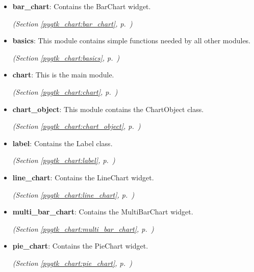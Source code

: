 \begin{itemize}
\setlength{\parskip}{0ex}
\item \textbf{bar\_chart}: Contains the BarChart widget.



  \textit{(Section \ref{pygtk_chart:bar_chart}, p.~\pageref{pygtk_chart:bar_chart})}

\item \textbf{basics}: This module contains simple functions needed by all other modules.



  \textit{(Section \ref{pygtk_chart:basics}, p.~\pageref{pygtk_chart:basics})}

\item \textbf{chart}: This is the main module.



  \textit{(Section \ref{pygtk_chart:chart}, p.~\pageref{pygtk_chart:chart})}

\item \textbf{chart\_object}: This module contains the ChartObject class.



  \textit{(Section \ref{pygtk_chart:chart_object}, p.~\pageref{pygtk_chart:chart_object})}

\item \textbf{label}: Contains the Label class.



  \textit{(Section \ref{pygtk_chart:label}, p.~\pageref{pygtk_chart:label})}

\item \textbf{line\_chart}: Contains the LineChart widget.



  \textit{(Section \ref{pygtk_chart:line_chart}, p.~\pageref{pygtk_chart:line_chart})}

\item \textbf{multi\_bar\_chart}: Contains the MultiBarChart widget.



  \textit{(Section \ref{pygtk_chart:multi_bar_chart}, p.~\pageref{pygtk_chart:multi_bar_chart})}

\item \textbf{pie\_chart}: Contains the PieChart widget.



  \textit{(Section \ref{pygtk_chart:pie_chart}, p.~\pageref{pygtk_chart:pie_chart})}

\end{itemize}


